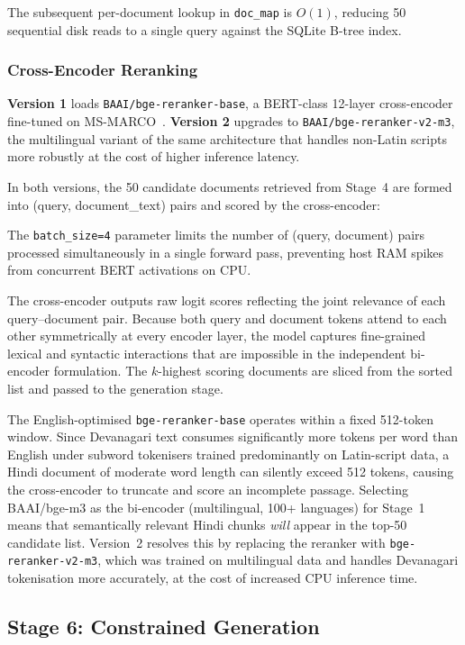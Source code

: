 \documentclass[conference]{IEEEtran}
\begin{document}
The subsequent per-document lookup in \texttt{doc\_map} is $O(1)$, reducing
50 sequential disk reads to a single query against the SQLite B-tree index.

\subsubsection{Cross-Encoder Reranking}

\textbf{Version 1} loads \texttt{BAAI/bge-reranker-base}, a BERT-class
12-layer cross-encoder fine-tuned on MS-MARCO~\cite{mrag_settings2024}.
\textbf{Version 2} upgrades to \texttt{BAAI/bge-reranker-v2-m3}, the
multilingual variant of the same architecture that handles non-Latin scripts
more robustly at the cost of higher inference latency.

In both versions, the 50 candidate documents retrieved from Stage~4 are
formed into (query, document\_text) pairs and scored by the cross-encoder:

\noindent The \texttt{batch\_size=4} parameter limits the number of
(query, document) pairs processed simultaneously in a single forward pass,
preventing host RAM spikes from concurrent BERT activations on CPU.

The cross-encoder outputs raw logit scores reflecting the joint relevance of
each query--document pair.
Because both query and document tokens attend to each other symmetrically at
every encoder layer, the model captures fine-grained lexical and syntactic
interactions that are impossible in the independent bi-encoder formulation.
The $k$-highest scoring documents are sliced from the sorted list and
passed to the generation stage.

The English-optimised \texttt{bge-reranker-base}
operates within a fixed 512-token window.
Since Devanagari text consumes significantly more tokens per word than English
under subword tokenisers trained predominantly on Latin-script data, a Hindi
document of moderate word length can silently exceed 512 tokens, causing the
cross-encoder to truncate and score an incomplete passage.
Selecting BAAI/bge-m3 as the bi-encoder (multilingual, 100+ languages) for
Stage~1 means that semantically relevant Hindi chunks \emph{will} appear in
the top-50 candidate list.
Version~2 resolves this by replacing the reranker with
\texttt{bge-reranker-v2-m3}, which was trained on multilingual data and
handles Devanagari tokenisation more accurately, at the cost of increased
CPU inference time.

\subsection{Stage 6: Constrained Generation}
\label{sec:generation}
\end{document}
